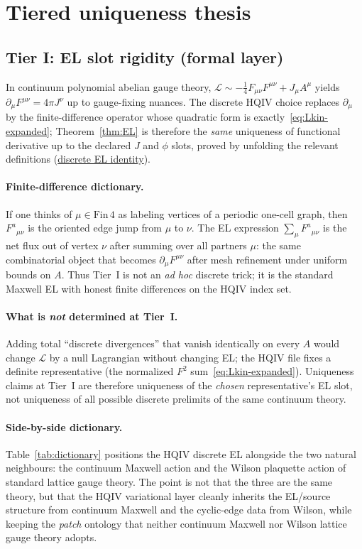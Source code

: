 \documentclass[11pt]{amsart}
\begin{document}
\section{Tiered uniqueness thesis}
\label{sec:tiers}

\subsection{Tier I: EL slot rigidity (formal layer)}

In continuum polynomial abelian gauge theory, \(\mathcal{L}\sim -\tfrac14 F_{\mu\nu}F^{\mu\nu}+J_\mu A^\mu\) yields \(\partial_\mu F^{\mu\nu}=4\pi J^\nu\) up to gauge-fixing nuances. The discrete HQIV choice replaces \(\partial_\mu\) by the finite-difference operator whose quadratic form is exactly~\eqref{eq:Lkin-expanded}; Theorem~\ref{thm:EL} is therefore the \emph{same} uniqueness of functional derivative up to the declared \(J\) and \(\phi\) slots, proved by unfolding the relevant definitions (\hyperref[lean:EL-divergence]{discrete EL identity}).

\paragraph{Finite-difference dictionary.}
If one thinks of \(\mu\in\mathrm{Fin}\,4\) as labeling vertices of a periodic one-cell graph, then \(F^a{}_{\mu\nu}\) is the oriented edge jump from \(\mu\) to \(\nu\). The EL expression \(\sum_\mu F^a{}_{\mu\nu}\) is the net flux out of vertex \(\nu\) after summing over all partners \(\mu\): the same combinatorial object that becomes \(\partial_\mu F^{\mu\nu}\) after mesh refinement under uniform bounds on \(A\). Thus Tier~I is not an \emph{ad hoc} discrete trick; it is the standard Maxwell EL with honest finite differences on the HQIV index set.

\paragraph{What is \emph{not} determined at Tier~I.}
Adding total ``discrete divergences'' that vanish identically on every \(A\) would change \(\mathcal{L}\) by a null Lagrangian without changing EL; the HQIV file fixes a definite representative (the normalized \(F^2\) sum~\eqref{eq:Lkin-expanded}). Uniqueness claims at Tier~I are therefore uniqueness of the \emph{chosen} representative's EL slot, not uniqueness of all possible discrete prelimits of the same continuum theory.

\paragraph{Side-by-side dictionary.}
Table~\ref{tab:dictionary} positions the HQIV discrete EL alongside the two natural neighbours: the continuum Maxwell action and the Wilson plaquette action of standard lattice gauge theory. The point is not that the three are the same theory, but that the HQIV variational layer cleanly inherits the EL/source structure from continuum Maxwell and the cyclic-edge data from Wilson, while keeping the \emph{patch} ontology that neither continuum Maxwell nor Wilson lattice gauge theory adopts.
\end{document}
